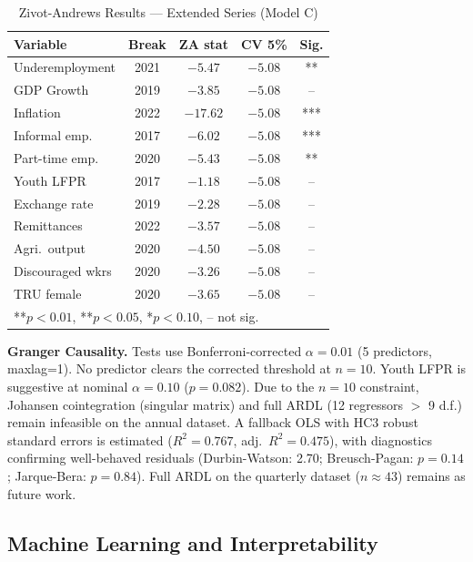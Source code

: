 \documentclass[sigconf]{acmart}
\begin{document}
\begin{table}[h]
\caption{Zivot-Andrews Results --- Extended Series (Model C)}
\label{tab:za}
\setlength{\tabcolsep}{3pt}
\footnotesize
\begin{tabular}{lcccc}
\toprule
\textbf{Variable} & \textbf{Break} & \textbf{ZA stat} & \textbf{CV 5\%} & \textbf{Sig.}\\
\midrule
Underemployment   & 2021 & $-5.47$ & $-5.08$ & **  \\
GDP Growth        & 2019 & $-3.85$ & $-5.08$ & --  \\
Inflation         & 2022 & $-17.62$& $-5.08$ & *** \\
Informal emp.     & 2017 & $-6.02$ & $-5.08$ & *** \\
Part-time emp.    & 2020 & $-5.43$ & $-5.08$ & **  \\
Youth LFPR        & 2017 & $-1.18$ & $-5.08$ & --  \\
Exchange rate     & 2019 & $-2.28$ & $-5.08$ & --  \\
Remittances       & 2022 & $-3.57$ & $-5.08$ & --  \\
Agri.\ output     & 2020 & $-4.50$ & $-5.08$ & --  \\
Discouraged wkrs  & 2020 & $-3.26$ & $-5.08$ & --  \\
TRU female        & 2020 & $-3.65$ & $-5.08$ & --  \\
\midrule
\multicolumn{5}{l}{\scriptsize ***$p{<}0.01$, **$p{<}0.05$, *$p{<}0.10$, -- not sig.}\\
\bottomrule
\end{tabular}
\end{table}

\textbf{Granger Causality.} Tests use Bonferroni-corrected $\alpha{=}0.01$
(5 predictors, maxlag=1). No predictor clears the corrected threshold at
$n{=}10$. Youth LFPR is suggestive at nominal $\alpha{=}0.10$
($p{=}0.082$). Due to the $n{=}10$ constraint, Johansen cointegration
(singular matrix) and full ARDL (12 regressors ${>}$ 9 d.f.) remain
infeasible on the annual dataset. A fallback OLS with HC3 robust standard
errors is estimated ($R^2{=}0.767$, adj.~$R^2{=}0.475$), with diagnostics
confirming well-behaved residuals (Durbin-Watson: 2.70; Breusch-Pagan:
$p{=}0.14$; Jarque-Bera: $p{=}0.84$). Full ARDL on the quarterly dataset
($n{\approx}43$) remains as future work.

\subsection{Machine Learning and Interpretability}
\end{document}
